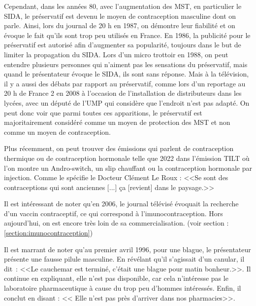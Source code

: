 \documentclass[12pt,a4paper]{report}
\begin{document}
Cependant, dans les années 80, avec l'augmentation des MST, en particulier le SIDA, le préservatif est devenu le moyen de contraception masculine dont on parle. Ainsi, lors du journal de 20 h en 1987, on démontre leur fiabilité et on évoque le fait qu'ils sont trop peu utilisés en France. \cite{EssaisPreservatifsINA} En 1986, la publicité pour le préservatif est autorisé afin d'augmenter sa popularité, toujours dans le but de limiter la propagation du SIDA. \cite{PublicitePreservatifsSida} Lors d'un micro trottoir en 1988, on peut entendre plusieurs personnes qui n'aiment pas les sensations du préservatif, mais quand le présentateur évoque le SIDA, ils sont sans réponse. \cite{DebatPreservatifsDans}
Mais à la télévision, il y a aussi des débats par rapport au préservatif, comme lors d'un reportage au 20 h de France 2 en 2008 à l'occasion de l'installation de distributeurs dans les lycées, avec un député de l'UMP qui considère que l'endroit n'est pas adapté. \cite{DebatPreservatifsDans} On peut donc voir que parmi toutes ces apparitions, le préservatif est majoritairement considéré comme un moyen de protection des MST et non comme un moyen de contraception.

Plus récemment, on peut trouver des émissions qui parlent de contraception thermique ou de contraception hormonale telle que 2022 dans l'émission TILT où l'on montre un Andro-switch, un slip chauffant ou la contraception hormonale par injection. Comme le spécifie le Docteur Clément Le Roux : <<Se sont des contraceptions qui sont anciennes [...] ça [revient] dans le paysage.>>\cite{tvtours-valdeloireContraceptionMasculineConnaissezvous2022}

Il est intéressant de noter qu'en 2006, le journal télévisé évoquait la recherche d'un vaccin contraceptif, ce qui correspond à l'imunocontraception. Hors aujourd'hui, on est encore très loin de sa commercialisation. (voir section : \ref{section:imunocontraception}) \cite{ContraceptionMasculinePilule}

Il est marrant de noter qu'au premier avril 1996, pour une blague, le présentateur présente une fausse pilule masculine. En révélant qu'il s'agissait d'un canular, il dit : <<Le cauchemar est terminé, c'était une blague pour matin bonheur.>>. Il continue en expliquant, elle n'est pas disponible, car cela n'intéresse pas le laboratoire pharmaceutique à cause du trop peu d'hommes intéressés. Enfin, il conclut en disant : << Elle n'est pas près d'arriver dans nos pharmacies>>. \cite{PremierePilulePour}
\end{document}
